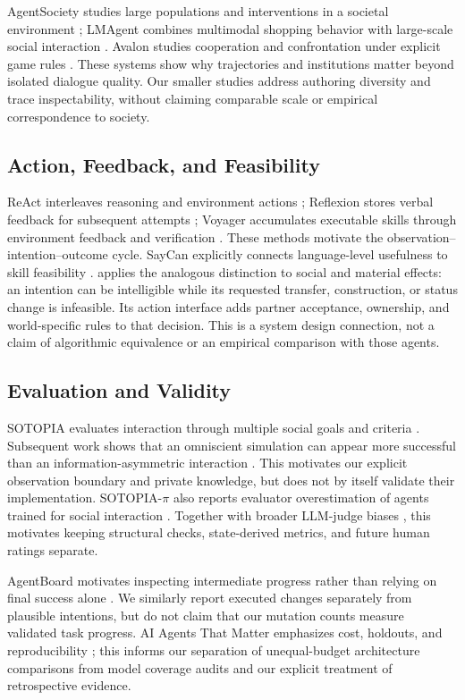 AgentSociety studies large populations and interventions in a societal
environment \cite{agentsociety}; LMAgent combines multimodal shopping behavior
with large-scale social interaction \cite{lmagent}. Avalon studies cooperation
and confrontation under explicit game rules \cite{avalon}. These systems show
why trajectories and institutions matter beyond isolated dialogue quality.
Our smaller studies address authoring diversity and trace inspectability,
without claiming comparable scale or empirical correspondence to society.

\subsection{Action, Feedback, and Feasibility}
ReAct interleaves reasoning and environment actions \cite{react}; Reflexion
stores verbal feedback for subsequent attempts \cite{reflexion}; Voyager
accumulates executable skills through environment feedback and verification
\cite{voyager}. These methods motivate the observation--intention--outcome
cycle. SayCan explicitly connects language-level usefulness to skill
feasibility \cite{saycan}. \agora applies the analogous distinction to social
and material effects: an intention can be intelligible while its requested
transfer, construction, or status change is infeasible. Its action interface
adds partner acceptance, ownership, and world-specific rules to that decision.
This is a system design connection, not a claim of algorithmic equivalence or
an empirical comparison with those agents.

\subsection{Evaluation and Validity}
SOTOPIA evaluates interaction through multiple social goals and criteria
\cite{zhou2024}. Subsequent work shows that an omniscient simulation can appear
more successful than an information-asymmetric interaction \cite{misleading}.
This motivates our explicit observation boundary and private knowledge, but
does not by itself validate their implementation. SOTOPIA-$\pi$ also reports evaluator overestimation of agents trained for
social interaction \cite{sotopiapi}. Together with broader LLM-judge biases
\cite{judge}, this motivates keeping structural checks, state-derived metrics,
and future human ratings separate.

AgentBoard motivates inspecting intermediate progress rather than relying on
final success alone \cite{agentboard}. We similarly report executed changes
separately from plausible intentions, but do not claim that our mutation
counts measure validated task progress. AI Agents That Matter emphasizes
cost, holdouts, and reproducibility \cite{agentsmatter}; this informs our
separation of unequal-budget architecture comparisons from model coverage
audits and our explicit treatment of retrospective evidence.

